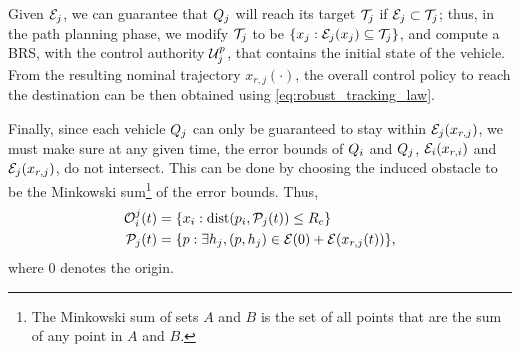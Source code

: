 Given $\mathcal{E}_j$, we can guarantee that $Q_j$ will reach its target $\mathcal{T}_j$ if $\mathcal{E}_j \subset \mathcal{T}_j$; thus, in the path planning phase, we modify $\mathcal{T}_j$ to be $\{x_j: \mathcal{E}_j(x_j) \subseteq \mathcal{T}_j\}$, and compute a BRS, with the control authority $\mathcal{U}^p_j$, that contains the initial state of the vehicle. From the resulting nominal trajectory $x_{r,j}(\cdot)$, the overall control policy to reach the destination can be then obtained using \eqref{eq:robust_tracking_law}.

Finally, since each vehicle $Q_j$ can only be guaranteed to stay within $\mathcal{E}_j(x_{r,j})$, we must make sure at any given time, the error bounds of $Q_i$ and $Q_j$, $\mathcal{E}_i(x_{r,i})$ and $\mathcal{E}_j(x_{r,j})$, do not intersect. This can be done by choosing the induced obstacle to be the Minkowski sum\footnote{The Minkowski sum of sets $A$ and $B$ is the set of all points that are the sum of any point in $A$ and $B$.} of the error bounds. Thus,
\vspace{-0.3em}
\begin{equation}
\begin{aligned}
\mathcal{O}_i^j(t) &= \{x_i: \text{dist}(p_i, \mathcal{P}_j(t)) \le R_c \} \\
\mathcal{P}_j(t) &= \{p: \exists h_j, (p, h_j) \in \mathcal{E}(0) + \mathcal{E}(x_{r,j}(t)) \},
\end{aligned}
\end{equation}
\noindent where $0$ denotes the origin. 



